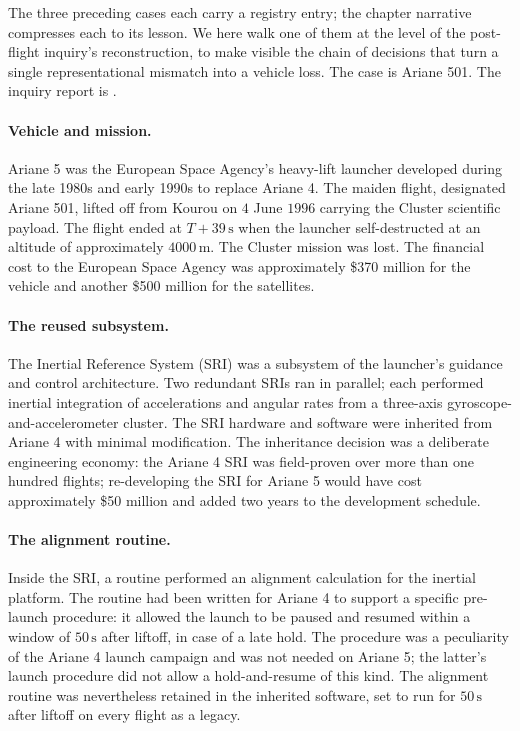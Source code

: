 The three preceding cases each carry a registry entry; the chapter
narrative compresses each to its lesson. We here walk one of them at
the level of the post-flight inquiry's reconstruction, to make visible
the chain of decisions that turn a single representational mismatch
into a vehicle loss. The case is Ariane 501. The inquiry report is
\cite{acc:ariane501-ifr}.

\paragraph{Vehicle and mission.} Ariane 5 was the European Space
Agency's heavy-lift launcher developed during the late 1980s and
early 1990s to replace Ariane 4. The maiden flight, designated
Ariane 501, lifted off from Kourou on $4$ June $1996$ carrying the
Cluster scientific payload. The flight ended at $T+39
\,\si{\second}$ when the launcher self-destructed at an altitude of
approximately $4000 \,\si{\meter}$. The Cluster mission was lost.
The financial cost to the European Space Agency was approximately
\$370 million for the vehicle and another \$500 million for the
satellites.

\paragraph{The reused subsystem.} The Inertial Reference System (SRI)
was a subsystem of the launcher's guidance and control architecture.
Two redundant SRIs ran in parallel; each performed inertial
integration of accelerations and angular rates from a three-axis
gyroscope-and-accelerometer cluster. The SRI hardware and software
were inherited from Ariane 4 with minimal modification. The
inheritance decision was a deliberate engineering economy: the
Ariane 4 SRI was field-proven over more than one hundred flights;
re-developing the SRI for Ariane 5 would have cost approximately
\$50 million and added two years to the development schedule.

\paragraph{The alignment routine.} Inside the SRI, a routine
performed an alignment calculation for the inertial platform. The
routine had been written for Ariane 4 to support a specific
pre-launch procedure: it allowed the launch to be paused and resumed
within a window of $50 \,\si{\second}$ after liftoff, in case of a
late hold. The procedure was a peculiarity of the Ariane 4 launch
campaign and was not needed on Ariane 5; the latter's launch
procedure did not allow a hold-and-resume of this kind. The
alignment routine was nevertheless retained in the inherited
software, set to run for $50 \,\si{\second}$ after liftoff on every
flight as a legacy.

